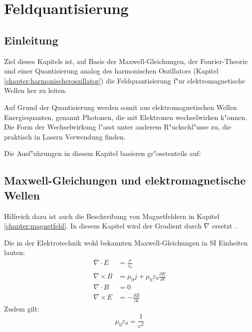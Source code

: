 \chapter{Feldquantisierung\label{chapter:feldquantisierung}}
\begin{refsection}

\printbibliography[heading=subbibliography]
\end{refsection}

\section{Einleitung}

Ziel dieses Kapitels ist, auf Basis der Maxwell-Gleichungen, der Fourier-Theorie und einer Quantisierung analog des harmonischen Oszillators (Kapitel \ref{chapter:harmonischeroszillator}) die Feldquantisierung f"ur elektromagnetische Wellen her zu leiten.

Auf Grund der Quantisierung werden somit aus elektromagnetischen Wellen Energiequanten, genannt Photonen, die mit Elektronen wechselwirken k"onnen. Die Form der Wechselwirkung l"asst unter anderem R"uckschl"usse zu, die praktisch in Lasern Verwendung finden.

Die Ausf"uhrungen in diesem Kapitel basieren gr"osstenteils auf: \cite{fq:aqm}

\section{Maxwell-Gleichungen und elektromagnetische Wellen}

Hilfreich dazu ist auch die Beschreibung von Magnetfeldern in Kapitel \ref{chapter:magnetfeld}. In diesem Kapitel wird der Gradient durch $\nabla$ ersetzt \cite{fq:nabla}.

Die in der Elektrotechnik wohl bekannten Maxwell-Gleichungen in SI Einheiten lauten:
\begin{align}
\nabla\cdot E &= \frac{\rho}{\varepsilon_0} \label{fq:maxwell_1}\\
\nabla\times B &= \mu_0 j  + \mu_0 \varepsilon_0\frac{\partial E}{\partial t} \label{fq:maxwell_2}\\
\nabla\cdot B &=0 \label{fq:maxwell_3}\\
\nabla\times E &= -\frac{\partial B }{\partial t} \label{fq:maxwell_4}
\end{align}
Zudem gilt:
\begin{equation*}
\mu_0\varepsilon_0=\frac{1}{c^2}
\end{equation*}

